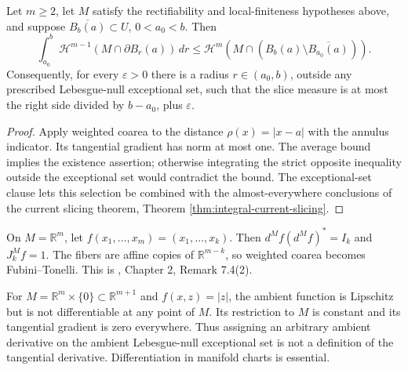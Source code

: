 \begin{proposition}\label{prop:rectifiable-radial-slice}
Let $m\geq2$, let $M$ satisfy the rectifiability and local-finiteness hypotheses above, and suppose $\overline{B_b(a)}\subset U$, $0<a_0<b$. Then
\[
 \int_{a_0}^b\mathcal H^{m-1}(M\cap\partial B_r(a))\,dr
 \leq\mathcal H^m(M\cap(B_b(a)\setminus\overline{B_{a_0}(a)})).
\]
Consequently, for every $\varepsilon>0$ there is a radius $r\in(a_0,b)$, outside any prescribed Lebesgue-null exceptional set, such that the slice measure is at most the right side divided by $b-a_0$, plus $\varepsilon$.
\end{proposition}
\begin{proof}
Apply weighted coarea to the distance $\rho(x)=|x-a|$ with the annulus indicator. Its tangential gradient has norm at most one. The average bound implies the existence assertion; otherwise integrating the strict opposite inequality outside the exceptional set would contradict the bound. The exceptional-set clause lets this selection be combined with the almost-everywhere conclusions of the current slicing theorem, Theorem \ref{thm:integral-current-slicing}.
\end{proof}

\begin{example}\label{ex:coarea-fubini}
On $M=\mathbb R^m$, let $f(x_1,\ldots,x_m)=(x_1,\ldots,x_k)$. Then $d^Mf(d^Mf)^*=I_k$ and $J^M_kf=1$. The fibers are affine copies of $\mathbb R^{m-k}$, so weighted coarea becomes Fubini--Tonelli. This is \cite{Sim18}, Chapter 2, Remark 7.4(2).
\end{example}

\begin{example}\label{ex:tangential-not-ambient}
For $M=\mathbb R^m\times\{0\}\subset\mathbb R^{m+1}$ and $f(x,z)=|z|$, the ambient function is Lipschitz but is not differentiable at any point of $M$. Its restriction to $M$ is constant and its tangential gradient is zero everywhere. Thus assigning an arbitrary ambient derivative on the ambient Lebesgue-null exceptional set is not a definition of the tangential derivative. Differentiation in manifold charts is essential.
\end{example}

